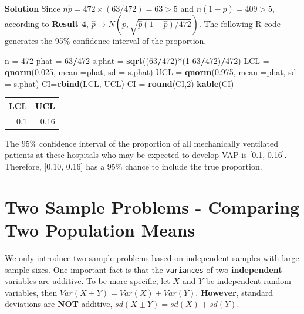 \documentclass[
]{book}
\newenvironment{Shaded}{\begin{snugshade}}{\end{snugshade}}
\newcommand{\AttributeTok}[1]{\textcolor[rgb]{0.13,0.29,0.53}{#1}}
\newcommand{\DecValTok}[1]{\textcolor[rgb]{0.00,0.00,0.81}{#1}}
\newcommand{\FloatTok}[1]{\textcolor[rgb]{0.00,0.00,0.81}{#1}}
\newcommand{\FunctionTok}[1]{\textcolor[rgb]{0.13,0.29,0.53}{\textbf{#1}}}
\newcommand{\NormalTok}[1]{#1}
\newcommand{\OtherTok}[1]{\textcolor[rgb]{0.56,0.35,0.01}{#1}}
\newcommand{\SpecialCharTok}[1]{\textcolor[rgb]{0.81,0.36,0.00}{\textbf{#1}}}
\begin{document}
\textbf{Solution} Since \(n\hat{p} = 472 \times (63/472) = 63 > 5\) and \(n(1-\hat{p}) = 409 > 5\), according to \textbf{Result 4}, \(\hat{p} \to N(p, \sqrt{\hat{p}(1-\hat{p})/472})\). The following R code generates the 95\% confidence interval of the proportion.

\begin{Shaded}
\begin{Highlighting}[]
\NormalTok{n }\OtherTok{=} \DecValTok{472}
\NormalTok{phat }\OtherTok{=} \DecValTok{63}\SpecialCharTok{/}\DecValTok{472}
\NormalTok{s.phat }\OtherTok{=} \FunctionTok{sqrt}\NormalTok{((}\DecValTok{63}\SpecialCharTok{/}\DecValTok{472}\NormalTok{)}\SpecialCharTok{*}\NormalTok{(}\DecValTok{1{-}63}\SpecialCharTok{/}\DecValTok{472}\NormalTok{)}\SpecialCharTok{/}\DecValTok{472}\NormalTok{)}
\NormalTok{LCL }\OtherTok{=} \FunctionTok{qnorm}\NormalTok{(}\FloatTok{0.025}\NormalTok{, }\AttributeTok{mean =}\NormalTok{phat, }\AttributeTok{sd =}\NormalTok{ s.phat)}
\NormalTok{UCL }\OtherTok{=} \FunctionTok{qnorm}\NormalTok{(}\FloatTok{0.975}\NormalTok{, }\AttributeTok{mean =}\NormalTok{phat, }\AttributeTok{sd =}\NormalTok{ s.phat)}
\NormalTok{CI}\OtherTok{=}\FunctionTok{cbind}\NormalTok{(LCL, UCL)}
\NormalTok{CI }\OtherTok{=} \FunctionTok{round}\NormalTok{(CI,}\DecValTok{2}\NormalTok{)}
\FunctionTok{kable}\NormalTok{(CI)}
\end{Highlighting}
\end{Shaded}

\begin{tabular}{r|r}
\hline
LCL & UCL\\
\hline
0.1 & 0.16\\
\hline
\end{tabular}

The 95\% confidence interval of the proportion of all mechanically ventilated patients at these hospitals who may be expected to develop VAP is {[}0.1, 0.16{]}. Therefore, {[}0.10, 0.16{]} has a 95\% chance to include the true proportion.

\hypertarget{two-sample-problems---comparing-two-population-means}{%
\section{Two Sample Problems - Comparing Two Population Means}\label{two-sample-problems---comparing-two-population-means}}

We only introduce two sample problems based on independent samples with large sample sizes. One important fact is that the \texttt{variances} of two \textbf{independent} variables are additive. To be more specific, let \(X\) and \(Y\) be independent random variables, then \(Var(X \pm Y) = Var(X) + Var(Y)\). \textbf{However}, standard deviations are \textbf{NOT} additive, \(sd(X \pm Y) = sd(X) + sd(Y)\).
\end{document}
